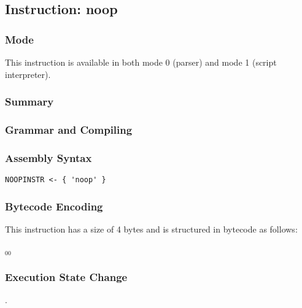 \subsection{Instruction: noop}

\subsubsection{Mode}
This instruction is available in both mode 0 (parser) and mode 1 (script interpreter).
\subsubsection{Summary}


\subsubsection{Grammar and Compiling}


\subsubsection{Assembly Syntax}

\begin{myquote}
\begin{verbatim}
NOOPINSTR <- { 'noop' }
\end{verbatim}
\end{myquote}

\subsubsection{Bytecode Encoding}

This instruction has a size of 4 bytes and is structured in bytecode as follows:

$_{00}$\ 

\subsubsection{Execution State Change}

.


